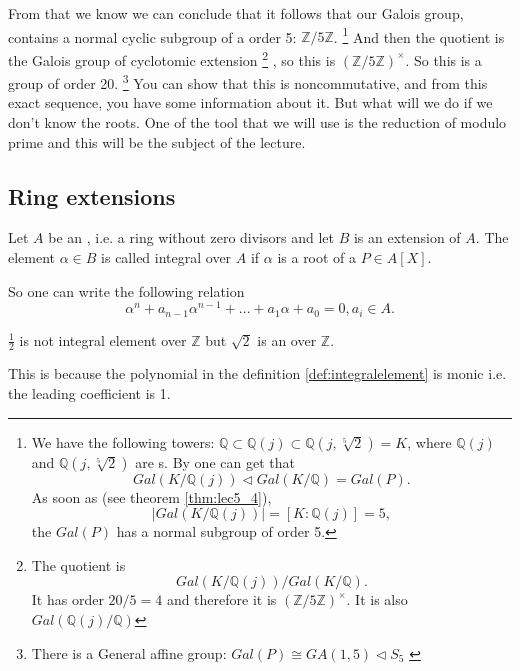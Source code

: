 From that we know we can conclude that it follows that our Galois
group, contains a normal cyclic subgroup of a order 5:
$\mathbb{Z}/5\mathbb{Z}$.
\footnote{
  We have the following towers:
  $\mathbb{Q} \subset \mathbb{Q}\left(j\right) \subset
  \mathbb{Q}\left(j, \sqrt[5]{2}\right) = K$, where
  $\mathbb{Q}\left(j\right)$ and $\mathbb{Q}\left(j,
  \sqrt[5]{2}\right)$ are s.
  By  one can get that
  \[
  Gal\left(K/\mathbb{Q}\left(j\right)\right) \triangleleft
  Gal\left(K/\mathbb{Q}\right) = Gal\left(P\right).
  \]
  As soon as (see theorem \ref{thm:lec5_4}),
  \[
  \left|Gal\left(K/\mathbb{Q}\left(j\right)\right)\right| =
  \left[K:\mathbb{Q}\left(j\right)\right] = 5,
  \]
  the $Gal(P)$ has a normal subgroup of order 5.
}
And then 
the quotient is the Galois group of cyclotomic extension
\footnote{
  The quotient is
  \[
  Gal\left(K/\mathbb{Q}\left(j\right)\right)/
  Gal\left(K/\mathbb{Q}\right).
  \]
  It has order $20/5=4$ and therefore it is
  $\left(\mathbb{Z}/5\mathbb{Z}\right)^\times$. It is also
  $Gal\left(\mathbb{Q}\left(j\right)/\mathbb{Q}\right)$
}
, so this is
$\left(\mathbb{Z}/5\mathbb{Z}\right)^\times$.
So this is a group of
order 20.
\footnote{
  There is a General affine group:
  $Gal(P) \cong GA(1,5) \triangleleft S_5$
  \cite{groupwiki:s5structure, groupwiki:generalaffinegroup}
}
You can show that this 
is noncommutative, and from this exact sequence, you have some
information about it. But what will we do if we don't know the
roots. One of the tool that we will use is the reduction of modulo
prime and this will be the subject of the lecture.

\subsection{Ring extensions}
\begin{definition}
  Let $A$ be an , i.e. a ring without zero
  divisors and let $B$ is an extension of $A$. The element $\alpha
  \in B$ is called integral over $A$ if $\alpha$ is a root of a
   $P \in A\left[X\right]$.

  So one can write the following relation
  \[
  \alpha^n + a_{n-1}\alpha^{n-1} + \dots + a_1 \alpha + a_0 = 0, a_i
  \in A.
  \]
  \label{def:integralelement}
\end{definition}

\begin{example}
  $\frac{1}{2}$ is not integral element over $\mathbb{Z}$ but
  $\sqrt{2}$ is an  over $\mathbb{Z}$.

  This is because the polynomial in the definition
  \ref{def:integralelement} is monic i.e. the leading coefficient is
  1. 
\end{example}

